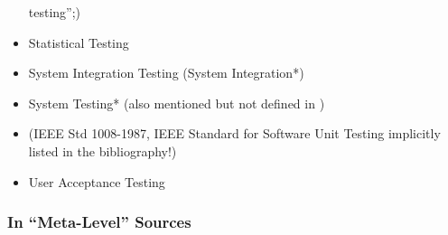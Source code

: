 \begin{itemize}
                  testing'';)
            \item Statistical Testing
            \item System Integration Testing (System Integration*)
            \item System Testing* (also mentioned but not defined in \citep{IEEE2013})
            \item {}
                  (IEEE Std 1008-1987, IEEE Standard for
                  Software Unit Testing implicitly listed in the bibliography!)
            \item User Acceptance Testing
      \end{itemize}
\fi

\subsubsection{In ``Meta-Level'' Sources}

